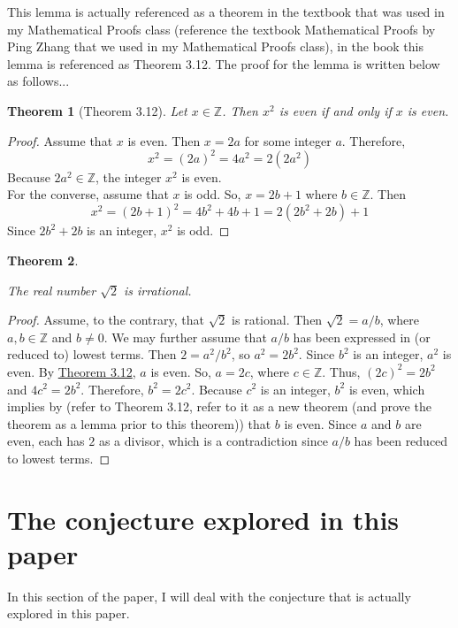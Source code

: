 \documentclass{article}
\newtheorem*{theorem*}{Theorem}
\begin{document}
This lemma is actually referenced as a theorem in the textbook that was used in my Mathematical Proofs class (reference the textbook Mathematical Proofs by Ping Zhang that we used in my Mathematical Proofs class), in the book this lemma is referenced as Theorem 3.12. The proof for the lemma is written below as follows... 

\begin{theorem*}[Theorem 3.12]\cite[p.$\Tilde{91}$]{Zhang2018}\hypertarget{Theorem 3.12}{}
    Let \(x \in \mathds{Z}\). Then \(x^2\) is even if and only if \(x\) is even. 
\end{theorem*} 

\begin{proof}
    Assume that \(x\) is even. Then \(x = 2a\) for some integer \(a\). Therefore, $$x^2 = (2a)^2 = 4a^2 = 2(2a^2)$$  Because \(2a^2 \in \mathds{Z}\), the integer \(x^2\) is even. \\  
     For the converse, assume that \(x\) is odd. So, \(x = 2b + 1\) where \(b \in \mathds{Z}\). Then \[x^2 = (2b +1)^2 = 4b^2 + 4b +1 = 2(2b^2 + 2b) + 1\] Since \(2b^2 + 2b\) is an integer, \(x^2\) is odd.  
\end{proof}


\begin{theorem*}\hypertarget{Ping Zhang's proof}{}\cite[p.$\Tilde{136}$]{Zhang2018}
    The real number \(\sqrt{2}\) is irrational. 
\end{theorem*} 

\begin{proof}
    Assume, to the contrary, that \(\sqrt{2}\) is rational. Then \(\sqrt{2} = a/b\), where \(a,b \in \mathds{Z}\) and \(b \neq 0\). We may further assume that \(a/b\) has been expressed in (or reduced to) lowest terms. Then \(2 = a^2/b^2\), so \(a^2 = 2b^2\). Since \(b^2\) is an integer, \(a^2\) is even. By \hyperlink{Theorem 3.12}{Theorem 3.12}, \(a\) is even. So, \(a = 2c\), where \(c \in \mathds{Z}\). Thus, \((2c)^2 = 2b^2\) and \(4c^2 = 2b^2\). Therefore, \(b^2 = 2c^2\). Because \(c^2\) is an integer, \(b^2\) is even, which implies by (refer to Theorem 3.12, refer to it as a new theorem (and prove the theorem as a lemma prior to this theorem)) that \(b\) is even. Since \(a\) and \(b\) are even, each has \(2\) as a divisor, which is a contradiction since \(a/b\) has been reduced to lowest terms.  
\end{proof}

\section{The conjecture explored in this paper} 
In this section of the paper, I will deal with the conjecture that is actually explored in this paper.  
\end{document}
